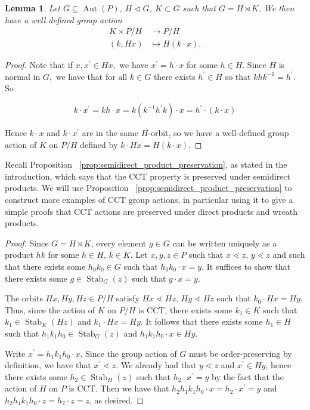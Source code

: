 \documentclass[smallextended, envcountsame, numbook]{svjour3}
\theoremstyle{plain}
\newtheorem{lem}[thm]{Lemma}
\theoremstyle{definition}
\theoremstyle{remark}
\numberwithin{equation}{section}
\newcommand\Stab{\operatorname{Stab}}
\newcommand\Aut{\operatorname{Aut}}
\begin{document}
\begin{lem}
Let $G\subseteq\Aut(P)$, $H\triangleleft G$, $K\subset G$ such that $G = H\rtimes K$. We then have a well defined group action 
\begin{align*}
K \times P/H &\rightarrow P/H \\
(k,Hx) &\mapsto H(k \cdot x).
\end{align*}

\end{lem}
\begin{proof}

Note that if $x,x^\prime\in Hx,$ we have $x^\prime = h\cdot x$ for some $h\in H$. Since $H$ is normal in $G,$ we have that for all $k \in G$ there exists $h^\prime \in H$ so that $khk^{-1} = h^\prime$. So 

$$k\cdot x^\prime = kh\cdot x = k(k^{-1}h^\prime k)\cdot x = h^\prime\cdot (k\cdot x)$$

Hence $k\cdot x$ and $k\cdot x^\prime$ are in the same $H$-orbit, so we have a well-defined group action of $K$ on $P/H$ defined by $k\cdot Hx = H(k\cdot x)$.
\end{proof}

Recall Proposition ~\ref{prop:semidirect_product_preservation}, as stated in the introduction, which says that the CCT property is preserved under semidirect products.  We will use Proposition ~\ref{prop:semidirect_product_preservation} to construct more examples of CCT group actions, in particular using it to give a simple proofs that CCT actions are preserved under direct products and wreath products.

\semidirect*

\begin{proof}
Since $G = H\rtimes K$, every element $g\in G$ can be written uniquely as a product $hk$ for some $h\in H$, $k\in K$.  Let $x,y,z\in P$ such that $x\lessdot z$, $y\lessdot z$ and such that there exists some $h_0k_0\in G$ such that $h_0k_0\cdot x = y$.  It suffices to show that there exists some $g\in \Stab_G(z)$ such that $g\cdot x = y$.

The orbits $Hx, Hy, Hz\in P/H$ satisfy $Hx\lessdot Hz$, $Hy\lessdot Hz$ such that $k_0\cdot Hx = Hy$. Thus, since the action of $K$ on $P/H$ is CCT, there exists some $k_1\in K$ such that $k_1\in \Stab_K(Hz)$ and $k_1\cdot Hx = Hy$.  It follows that there exists some $h_1\in H$ such that $h_1k_1h_0\in \Stab_G(z)$ and $h_1k_1h_0\cdot x\in Hy$.

Write $x^\prime = h_1k_1h_0\cdot x$.  Since the group action of $G$ must be order-preserving by definition, we have that $x^\prime \lessdot z$.  We already had that $y\lessdot z$ and $x^\prime\in Hy$, hence there exists some $h_2\in \Stab_H(z)$ such that $h_2\cdot x^\prime = y$ by the fact that the action of $H$ on $P$ is CCT.  Then we have that $h_2h_1k_1h_0\cdot x = h_2\cdot x^\prime = y$ and $h_2h_1k_1h_0\cdot z = h_2\cdot z = z$, as desired.
\end{proof}
\end{document}
